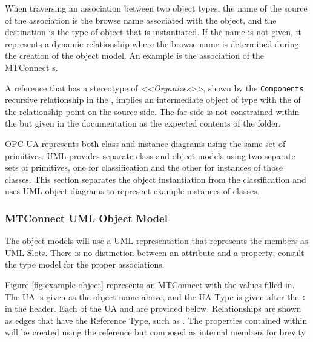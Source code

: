When traversing an association between two object types, the name of the source of the association is the browse name associated with the object, and the destination is the type of object that is instantiated. If the name is not given, it represents a dynamic relationship where the browse name is determined during the creation of the object model. An example is the association of the MTConnect s.


\FloatBarrier

A reference that has a stereotype of \textit{<<Organizes>>}, shown by the \texttt{Components} recursive relationship in the , implies an intermediate object of type  with the  of the relationship point on the source side. The far side is not constrained within the  but given in the documentation as the expected contents of the folder.

OPC UA represents both class and instance diagrams using the same set of primitives. UML provides separate class and object models using two separate sets of primitives, one for classification and the other for instances of those classes. This section separates the object instantiation from the classification and uses UML object diagrams to represent example instances of classes.

\FloatBarrier

\subsubsection{MTConnect UML Object Model}

The object models will use a UML representation that represents the members as UML Slots. There is no distinction between an attribute and a property; consult the type model for the proper associations.



Figure \ref{fig:example-object} represents an MTConnect  with the values filled in. The UA  is given as the object name above, and the UA Type is given after the \texttt{:} in the header. Each of the UA  and  are provided below. Relationships are shown as edges that have the Reference Type, such as . The properties contained within will be created using the  reference but composed as internal members for brevity.

